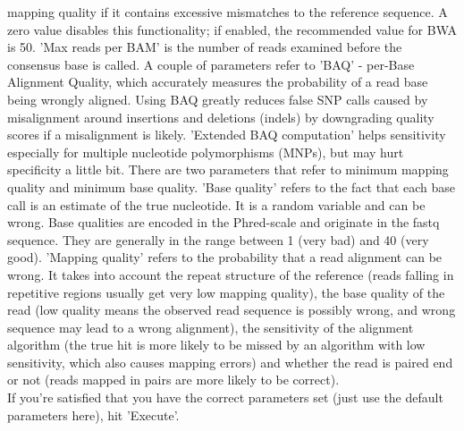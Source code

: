 \documentclass[12pt,a4paper]{article}
\begin{document}
\begin{enumerate}
          mapping quality if it contains excessive mismatches to the
          reference sequence. A zero value disables this
          functionality; if enabled, the recommended value for BWA is
          50. 'Max reads per BAM' is the number of reads examined
          before the consensus base is called.  A couple of parameters
          refer to 'BAQ' - per-Base Alignment Quality, which
          accurately measures the probability of a read base being
          wrongly aligned. Using BAQ greatly reduces false SNP calls
          caused by misalignment around insertions and deletions
          (indels) by downgrading quality scores if a misalignment is
          likely. 'Extended BAQ computation' helps sensitivity
          especially for multiple nucleotide polymorphisms (MNPs), but
          may hurt specificity a little bit. There are two parameters
          that refer to minimum mapping quality and minimum base
          quality. 'Base quality' refers to the fact that each base call
          is an estimate of the true nucleotide. It is a random
          variable and can be wrong. Base qualities are encoded in the
          Phred-scale and originate in the fastq sequence. They are
          generally in the range between 1 (very bad) and 40 (very
          good). 'Mapping quality' refers to the probability that a read
          alignment can be wrong. It takes into account the repeat
          structure of the reference (reads falling in repetitive
          regions usually get very low mapping quality), the base
          quality of the read (low quality means the observed read
          sequence is possibly wrong, and wrong sequence may lead to a
          wrong alignment), the sensitivity of the alignment algorithm
          (the true hit is more likely to be missed by an algorithm
          with low sensitivity, which also causes mapping errors) and
          whether the read is paired end or not (reads mapped in pairs
          are more likely to be correct). \\

          If you're satisfied that you have the correct parameters
          set (just use the default parameters here), hit 'Execute'.


\end{enumerate}
\end{document}
